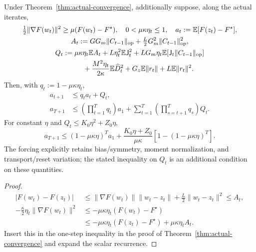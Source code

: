 \begin{corollary}
\label{cor:actual-PL}
Under Theorem~\ref{thm:actual-convergence}, additionally suppose, along the
actual iterates,
\begin{gather}
 \tfrac12\|\nabla F(w_t)\|^2\ge\mu(F(w_t)-F^\star),\quad
 0<\mu\kappa\eta_t\le1,\quad
 a_t:=\mathbb E[F(z_t)-F^\star],\\
 A_t:=GG_m\|C_{t-1}\|_{\mathrm{op}}
                    +\tfrac L2G_m^2\|C_{t-1}\|_{\mathrm{op}}^2,\\
 Q_t:=\mu\kappa\eta_t\mathbb E A_t+L\eta_t^2\mathbb E\mathsf J_t^2
       +LG_m\eta_t\mathbb E[\mathsf J_t\|C_{t-1}\|_{\mathrm{op}}]\\
 \hphantom{Q_t:=} +\frac{M^2\eta_t}{2\kappa}\mathbb E \widehat D_t^2
                    +G_z\mathbb E\|r_t\|+L\mathbb E\|r_t\|^2.
\end{gather}
Then, with $q_t:=1-\mu\kappa\eta_t$,
\begin{align}
 a_{t+1}&\le q_ta_t+Q_t,\\
 a_{T+1}&\le\left(\prod_{t=1}^Tq_t\right)a_1
          +\sum_{t=1}^T\left(\prod_{s=t+1}^Tq_s\right)Q_t.
\end{align}
For constant $\eta$ and $Q_t\le K_0\eta^2+Z_0\eta$,
\begin{equation}
 a_{T+1}\le(1-\mu\kappa\eta)^Ta_1+
              \frac{K_0\eta+Z_0}{\mu\kappa}
                               [1-(1-\mu\kappa\eta)^T].
\end{equation}
The forcing explicitly retains bias/symmetry, moment normalization, and
transport/reset variation; the stated inequality on $Q_t$ is an additional
condition on these quantities.
\end{corollary}
\begin{proof}
\begin{align}
 |F(w_t)-F(z_t)|
 &\le\|\nabla F(w_t)\|\|w_t-z_t\|+\tfrac L2\|w_t-z_t\|^2\le A_t,\\
 -\tfrac\kappa2\eta_t\|\nabla F(w_t)\|^2
 &\le-\mu\kappa\eta_t(F(w_t)-F^\star)\\
 &\le-\mu\kappa\eta_t(F(z_t)-F^\star)+\mu\kappa\eta_t A_t.
\end{align}
Insert this in the one-step inequality in the proof of
Theorem~\ref{thm:actual-convergence} and expand the scalar recurrence.
\end{proof}
